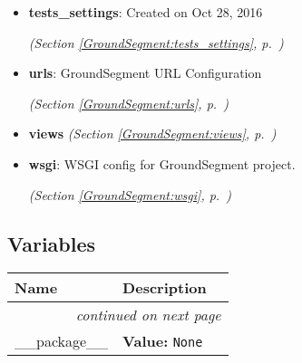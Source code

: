\begin{itemize}
\item \textbf{tests\_settings}: Created on Oct 28, 2016



  \textit{(Section \ref{GroundSegment:tests_settings}, p.~\pageref{GroundSegment:tests_settings})}

\item \textbf{urls}: GroundSegment URL Configuration




  \textit{(Section \ref{GroundSegment:urls}, p.~\pageref{GroundSegment:urls})}

\item \textbf{views}
  \textit{(Section \ref{GroundSegment:views}, p.~\pageref{GroundSegment:views})}

\item \textbf{wsgi}: WSGI config for GroundSegment project.



  \textit{(Section \ref{GroundSegment:wsgi}, p.~\pageref{GroundSegment:wsgi})}

\end{itemize}



  \subsection{Variables}

    \vspace{-1cm}
\hspace{\varindent}\begin{longtable}{|p{\varnamewidth}|p{\vardescrwidth}|l}
\cline{1-2}
\cline{1-2} \centering \textbf{Name} & \centering \textbf{Description}& \\
\cline{1-2}
\endhead\cline{1-2}\multicolumn{3}{r}{\small\textit{continued on next page}}\\\endfoot\cline{1-2}
\endlastfoot\raggedright \_\-\_\-p\-a\-c\-k\-a\-g\-e\-\_\-\_\- & \raggedright \textbf{Value:} 
{\tt None}&\\
\cline{1-2}
\end{longtable}

